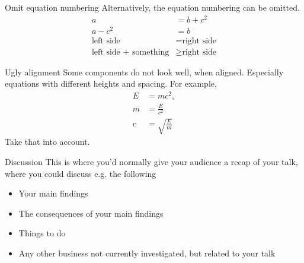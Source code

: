\documentclass[aspectratio=169]{beamer}
\begin{document}
\begin{frame}{Omit equation numbering}
Alternatively, the equation numbering can be omitted.
\begin{align*}
    a &= b + c^2\\
    a - c^2 &= b\\
    \text{left side} &= \text{right side}\\
    \text{left side + something} &\geq \text{right side}
\end{align*}    
    
\end{frame}

\begin{frame}{Ugly alignment}
Some components do not look well, when aligned. Especially equations with different
heights and spacing. For example,
\begin{align}
    E &= mc^2,\\
   m &= \frac{E}{c^2}\\
    c &= \sqrt{\frac{E}{m}}
    \end{align}
Take that into account. 
\end{frame}  

\begin{frame}{Discussion}
    This is where you’d normally give your audience a recap of your talk, where you could
discuss e.g. the following
\begin{itemize}
    \item Your main findings
    \item The consequences of your main findings
    \item Things to do 
    \item Any other business not currently investigated, but related to your talk
\end{itemize}
  
\end{frame}
\end{document}
